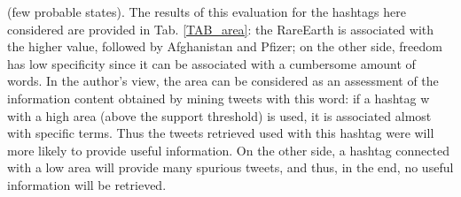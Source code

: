 \documentclass[12pt,%
               a4paper,%
               oneside,openany,%
               titlepage,%
               headinclude,footinclude,%
               BCOR5mm,%
               cleardoublepage=empty,%
               tablecaptionabove,%
               floatperchapter,
               ]{scrreprt}                 %
\begin{document}
(few probable states). The results of this evaluation for the hashtags here considered are provided in Tab. \ref{TAB_area}: the RareEarth is associated with the higher value, followed by Afghanistan and Pfizer; on the other side, freedom has low specificity since it can be associated with a cumbersome amount of words. In the author's view, the area can be considered as an assessment of the information content obtained by mining tweets with this word: if a hashtag w with a high area (above the support threshold) is used, it is associated almost with specific terms. Thus the tweets retrieved used with this hashtag were will more likely to provide useful information. On the other side, a hashtag connected with a low area will provide many spurious tweets, and thus, in the end, no useful information will be retrieved.
\end{document}
